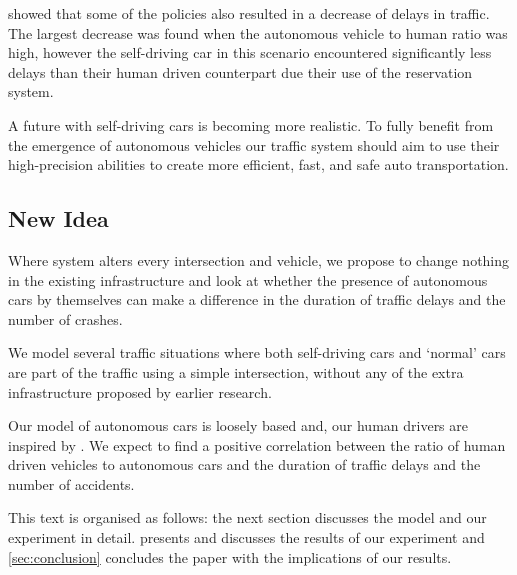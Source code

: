 \textcite{dresner2007sharing} showed that some of the policies also resulted in a decrease of delays in traffic. The largest decrease was found when the autonomous vehicle to human ratio was high, however the self-driving car in this scenario encountered significantly less delays than their human driven counterpart due their use of the reservation system.

A future with self-driving cars is becoming more realistic. To fully benefit from the emergence of autonomous vehicles our traffic system should aim to use their high-precision abilities to create more efficient, fast, and safe auto transportation.


\subsection{New Idea}
\label{sub:intro:new_idea}	
Where \textcite{dresner2007sharing} system alters every intersection and vehicle, we propose to change nothing in the existing infrastructure and look at whether the presence of autonomous cars by themselves can make a difference in the duration of traffic delays and the number of crashes. 

We model several traffic situations where both self-driving cars and `normal' cars are part of the traffic using a simple intersection, without any of the extra infrastructure proposed by earlier research. 


Our model of autonomous cars is loosely based \textcite{jiang2010microscopic} and, our human drivers are inspired by \textcite{paruchuri2002multi}. We expect to find a positive correlation between the ratio of human driven vehicles to autonomous cars and the duration of traffic delays and the number of accidents.

This text is organised as follows: the next section discusses the model and our experiment in detail.  presents and discusses the results of our experiment and \cref{sec:conclusion} concludes the paper with the implications of our results.
